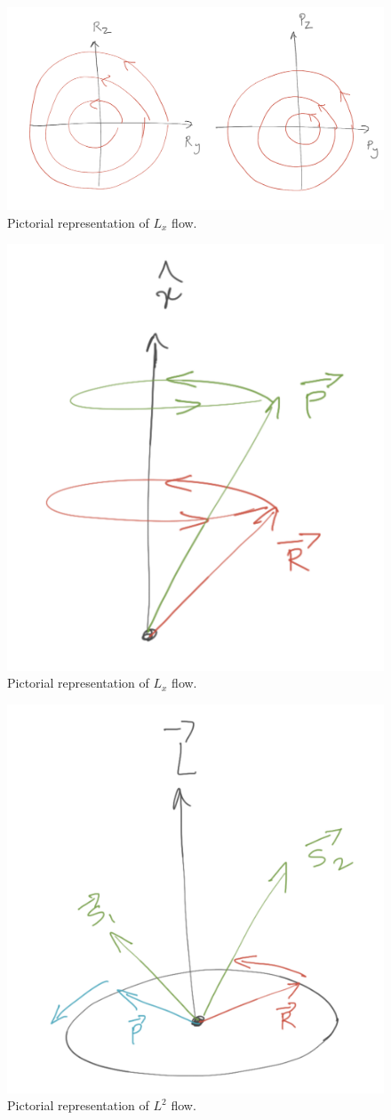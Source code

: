 \begin{figure}
    \centering
  \includegraphics[width=0.4\linewidth]{Lx_flow}
  \caption{Pictorial representation of $L_x$ flow.
    \vspace{-1.em}
  }
  \label{Lx_flow}
\end{figure}



\begin{figure}
   \centering
  \includegraphics[width=0.4\linewidth]{Lx_flow_2}
  \caption{Pictorial representation of $L_x$ flow.
    \vspace{-1.em}
  }
  \label{Lx_flow_2}
\end{figure}




\begin{figure}
    \centering
  \includegraphics[width=0.4 \linewidth]{Lsq_flow}
  \caption{Pictorial representation of $L^2$ flow.
    \vspace{-1.em}
  }
  \label{Lsq_flow}
\end{figure}




